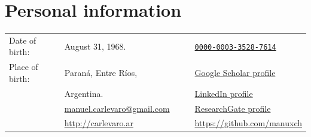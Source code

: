 \section*{Personal information}
\begin{center}
	\begin{tabular}{l l p{1cm} c l}
		Date of birth:                                        & August 31, 1968.                                                     &  &          & \href{https://orcid.org/0000-0003-3528-7614}{\texttt{0000-0003-3528-7614}}                                          \\

		Place of birth:                                       & Paraná, Entre Ríos,                                                  &  &  & \href{https://scholar.google.com.ar/citations?user=FoBqqJgAAAAJ                    & hl=en}{Google Scholar profile} \\
		                                                      & Argentina.                                                           &  & \color{DimGrey}{\faLinkedin}            & \href{https://www.linkedin.com/in/carlevaro/}{LinkedIn profile}                                                     \\
		      & \href{mailto:manuel.carlevaro@gmail.com}{manuel.carlevaro@gmail.com} &  & \color{DimGrey}{\aiResearchGate}        & \href{https://www.researchgate.net/profile/Manuel-Carlevaro}{ResearchGate profile}                                  \\
		 & \href{http://carlevaro.ar}{http://carlevaro.ar}                      &  & \color{DimGrey}{\faGithub}              & \href{https://github.com/manuxch}{https://github.com/manuxch}
	\end{tabular}
\end{center}
